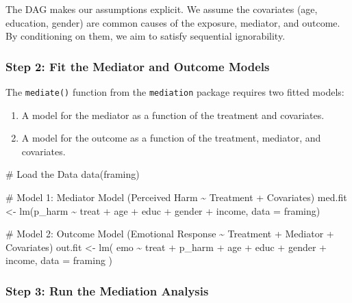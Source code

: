 \documentclass[
  10pt,
  letterpaper,
  DIV=11,
  numbers=noendperiod,
  oneside]{scrartcl}
\newenvironment{Shaded}{\begin{snugshade}}{\end{snugshade}}
\newcommand{\AttributeTok}[1]{\textcolor[rgb]{0.40,0.45,0.13}{#1}}
\newcommand{\CommentTok}[1]{\textcolor[rgb]{0.37,0.37,0.37}{#1}}
\newcommand{\FunctionTok}[1]{\textcolor[rgb]{0.28,0.35,0.67}{#1}}
\newcommand{\NormalTok}[1]{\textcolor[rgb]{0.00,0.23,0.31}{#1}}
\newcommand{\OtherTok}[1]{\textcolor[rgb]{0.00,0.23,0.31}{#1}}
\newcommand{\SpecialCharTok}[1]{\textcolor[rgb]{0.37,0.37,0.37}{#1}}
\providecommand{\tightlist}{%
  \setlength{\itemsep}{0pt}\setlength{\parskip}{0pt}}
\begin{document}
The DAG makes our assumptions explicit. We assume the covariates (age,
education, gender) are common causes of the exposure, mediator, and
outcome. By conditioning on them, we aim to satisfy sequential
ignorability.

\subsubsection{Step 2: Fit the Mediator and Outcome
Models}\label{step-2-fit-the-mediator-and-outcome-models}

The \texttt{mediate()} function from the \texttt{mediation} package
requires two fitted models:

\begin{enumerate}
\def\labelenumi{\arabic{enumi}.}
\tightlist
\item
  A model for the mediator as a function of the treatment and
  covariates.
\item
  A model for the outcome as a function of the treatment, mediator, and
  covariates.
\end{enumerate}

\begin{Shaded}
\begin{Highlighting}[]
\CommentTok{\# Load the Data}
\FunctionTok{data}\NormalTok{(framing)}

\CommentTok{\# Model 1: Mediator Model (Perceived Harm \textasciitilde{} Treatment + Covariates)}
\NormalTok{med.fit }\OtherTok{\textless{}{-}} \FunctionTok{lm}\NormalTok{(p\_harm }\SpecialCharTok{\textasciitilde{}}\NormalTok{ treat }\SpecialCharTok{+}\NormalTok{ age }\SpecialCharTok{+}\NormalTok{ educ }\SpecialCharTok{+}\NormalTok{ gender }\SpecialCharTok{+}\NormalTok{ income, }\AttributeTok{data =}\NormalTok{ framing)}

\CommentTok{\# Model 2: Outcome Model (Emotional Response \textasciitilde{} Treatment + Mediator + Covariates)}
\NormalTok{out.fit }\OtherTok{\textless{}{-}} \FunctionTok{lm}\NormalTok{(}
\NormalTok{  emo }\SpecialCharTok{\textasciitilde{}}\NormalTok{ treat }\SpecialCharTok{+}\NormalTok{ p\_harm }\SpecialCharTok{+}\NormalTok{ age }\SpecialCharTok{+}\NormalTok{ educ }\SpecialCharTok{+}\NormalTok{ gender }\SpecialCharTok{+}\NormalTok{ income,}
  \AttributeTok{data =}\NormalTok{ framing}
\NormalTok{)}
\end{Highlighting}
\end{Shaded}

\subsubsection{Step 3: Run the Mediation
Analysis}\label{step-3-run-the-mediation-analysis}
\end{document}
